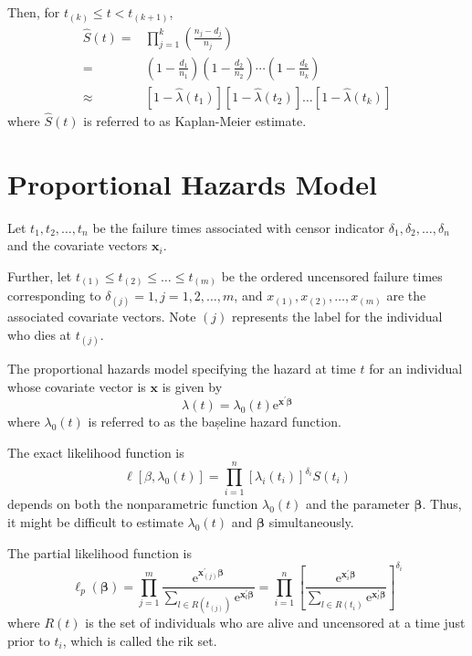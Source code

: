 Then, for $t_{(k)}\leq t<t_{(k+1)}$,
\begin{equation}
	\begin{aligned}
		\hat{S}(t)= & \prod_{j=1}^{k}\left(\frac{n_{j}-d_{j}}{n_{j}}\right)                                                                                             \\
		=           & \left(1-\frac{d_{1}}{n_{1}}\right)\left(1-\frac{d_{2}}{n_{2}}\right) \cdots\left(1-\frac{d_{k}}{n_{k}}\right)                                     \\
		\approx     & \left[1-\hat{\lambda}\left(t_{1}\right)\right]\left[1-\hat{\lambda}\left(t_{2}\right)\right] \ldots\left[1-\hat{\lambda}\left(t_{k}\right)\right]
	\end{aligned}
\end{equation}
where $\hat{S}(t)$ is referred to as Kaplan-Meier estimate.

\section{Proportional Hazards Model}

Let $t_{1},t_{2},\ldots,t_{n}$ be the failure times associated with censor indicator $\delta_{1},\delta_{2},\ldots,\delta_{n}$ and the covariate vectors $\mathbf{x}_{i}$.

Further, let $t_{(1)}\leq t_{(2)}\leq\ldots\leq t_{(m)}$ be the ordered uncensored failure times corresponding to $\delta_{(j)}=1,j=1,2,\ldots,m$, and $x_{(1)},x_{(2)},\ldots,x_{(m)}$ are the associated covariate vectors. Note $(j)$ represents the label for the individual who dies at $t_{(j)}$.

The proportional hazards model specifying the hazard at time $t$ for an individual whose covariate vector is $\mathbf{x}$ is given by
\begin{equation}
	\lambda(t)=\lambda_{0}(t)\mathrm{e}^{\mathbf{x}^{\prime}\boldsymbol{\beta}}
\end{equation}
where $\lambda_{0}(t)$ is referred to as the bașeline hazard function.

The exact likelihood function is
\begin{equation}
	\ell\left[\beta,\lambda_{0}(t)\right]=\prod_{i=1}^{n}\left[\lambda_{i}\left(t_{i}\right)\right]^{\delta_{i}}S\left(t_{i}\right)
\end{equation}
depends on both the nonparametric function $\lambda_{0}(t)$ and the parameter $\boldsymbol{\beta}$. Thus, it might be difficult to estimate $\lambda_{0}(t)$ and $\boldsymbol{\beta}$ simultaneously.

The partial likelihood function is
\begin{equation}
	\ell_{p}(\boldsymbol{\beta})=\prod_{j=1}^{m}\frac{\mathrm{e}^{\mathbf{x}_{(j)}^{\prime}\boldsymbol{\beta}}}{\sum_{l\in R\left(t_{(j)}\right)}\mathrm{e}^{\mathbf{x}_{l}^{\prime}\boldsymbol{\beta}}}=\prod_{i=1}^{n}\left[\frac{\mathrm{e}^{\mathbf{x}_{i}^{\prime}\boldsymbol{\beta}}}{\sum_{l\in R\left(t_{i}\right)}\mathrm{e}^{\mathbf{x}_{l}^{\prime}\boldsymbol{\beta}}}\right]^{\delta_{i}}
\end{equation}
where $R(t)$ is the set of individuals who are alive and uncensored at a time just prior to $t_{i}$, which is called the rik set.
